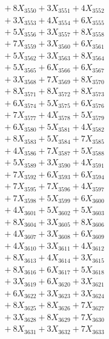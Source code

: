\documentclass[a4paper,10pt]{article}
\begin{document}
{\begin{align}
&\;  + 8 X_{3550} + 3 X_{3551} + 4 X_{3552} \\[0.3ex]
&\;  + 3 X_{3553} + 4 X_{3554} + 6 X_{3555} \\[0.3ex]
&\;  + 5 X_{3556} + 3 X_{3557} + 8 X_{3558} \\[0.3ex]
&\;  + 7 X_{3559} + 3 X_{3560} + 6 X_{3561} \\[0.3ex]
&\;  + 5 X_{3562} + 3 X_{3563} + 8 X_{3564} \\[0.3ex]
&\;  + 5 X_{3565} + 6 X_{3566} + 6 X_{3567} \\[0.3ex]
&\;  + 3 X_{3568} + 7 X_{3569} + 8 X_{3570} \\[0.3ex]
&\;  + 8 X_{3571} + 8 X_{3572} + 8 X_{3573} \\[0.3ex]
&\;  + 6 X_{3574} + 5 X_{3575} + 6 X_{3576} \\[0.3ex]
&\;  + 7 X_{3577} + 4 X_{3578} + 5 X_{3579} \\[0.5ex]\allowbreak
&\;  + 6 X_{3580} + 5 X_{3581} + 4 X_{3582} \\[0.3ex]
&\;  + 8 X_{3583} + 5 X_{3584} + 7 X_{3585} \\[0.3ex]
&\;  + 4 X_{3586} + 7 X_{3587} + 5 X_{3588} \\[0.3ex]
&\;  + 5 X_{3589} + 3 X_{3590} + 4 X_{3591} \\[0.3ex]
&\;  + 7 X_{3592} + 6 X_{3593} + 6 X_{3594} \\[0.3ex]
&\;  + 7 X_{3595} + 7 X_{3596} + 4 X_{3597} \\[0.3ex]
&\;  + 7 X_{3598} + 5 X_{3599} + 6 X_{3600} \\[0.3ex]
&\;  + 4 X_{3601} + 5 X_{3602} + 5 X_{3603} \\[0.3ex]
&\;  + 8 X_{3604} + 3 X_{3605} + 8 X_{3606} \\[0.3ex]
&\;  + 4 X_{3607} + 3 X_{3608} + 6 X_{3609} \\[0.5ex]\allowbreak
&\;  + 4 X_{3610} + 3 X_{3611} + 4 X_{3612} \\[0.3ex]
&\;  + 8 X_{3613} + 4 X_{3614} + 3 X_{3615} \\[0.3ex]
&\;  + 8 X_{3616} + 6 X_{3617} + 5 X_{3618} \\[0.3ex]
&\;  + 3 X_{3619} + 6 X_{3620} + 3 X_{3621} \\[0.3ex]
&\;  + 6 X_{3622} + 3 X_{3623} + 3 X_{3624} \\[0.3ex]
&\;  + 8 X_{3625} + 8 X_{3626} + 7 X_{3627} \\[0.3ex]
&\;  + 3 X_{3628} + 8 X_{3629} + 7 X_{3630} \\[0.3ex]
&\;  + 8 X_{3631} + 3 X_{3632} + 7 X_{3633} \\[0.3ex]

\end{align}}
\end{document}

